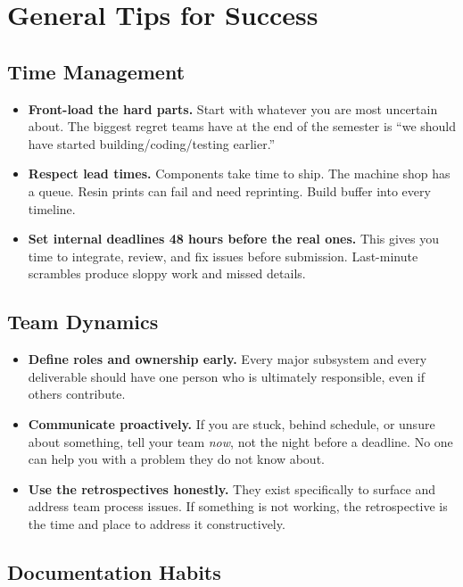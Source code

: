 \section{General Tips for Success}

\subsection{Time Management}

\begin{itemize}[leftmargin=*, itemsep=4pt]
    \item \textbf{Front-load the hard parts.} Start with whatever you are most uncertain about. The biggest regret teams have at the end of the semester is ``we should have started building/coding/testing earlier.''
    \item \textbf{Respect lead times.} Components take time to ship. The machine shop has a queue. Resin prints can fail and need reprinting. Build buffer into every timeline.
    \item \textbf{Set internal deadlines 48 hours before the real ones.} This gives you time to integrate, review, and fix issues before submission. Last-minute scrambles produce sloppy work and missed details.
\end{itemize}

\subsection{Team Dynamics}

\begin{itemize}[leftmargin=*, itemsep=4pt]
    \item \textbf{Define roles and ownership early.} Every major subsystem and every deliverable should have one person who is ultimately responsible, even if others contribute.
    \item \textbf{Communicate proactively.} If you are stuck, behind schedule, or unsure about something, tell your team \textit{now}, not the night before a deadline. No one can help you with a problem they do not know about.
    \item \textbf{Use the retrospectives honestly.} They exist specifically to surface and address team process issues. If something is not working, the retrospective is the time and place to address it constructively.
\end{itemize}

\subsection{Documentation Habits}

